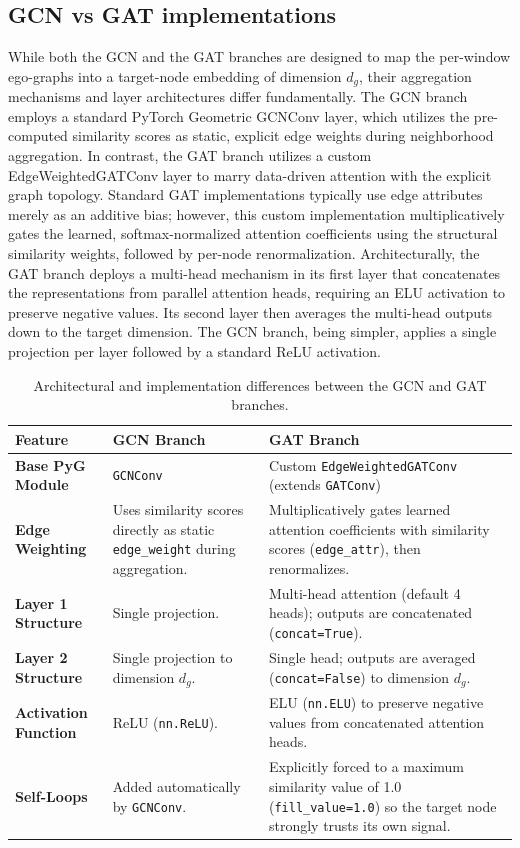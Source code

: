 \subsection{GCN vs GAT implementations}
While both the GCN and the GAT branches are designed to map the per-window ego-graphs into a target-node embedding of dimension $d_g$, their aggregation mechanisms and layer architectures differ fundamentally. The GCN branch employs a standard PyTorch Geometric GCNConv layer, which utilizes the pre-computed similarity scores as static, explicit edge weights during neighborhood aggregation. In contrast, the GAT branch utilizes a custom EdgeWeightedGATConv layer to marry data-driven attention with the explicit graph topology. Standard GAT implementations typically use edge attributes merely as an additive bias; however, this custom implementation multiplicatively gates the learned, softmax-normalized attention coefficients using the structural similarity weights, followed by per-node renormalization. Architecturally, the GAT branch deploys a multi-head mechanism in its first layer that concatenates the representations from parallel attention heads, requiring an ELU activation to preserve negative values. Its second layer then averages the multi-head outputs down to the target dimension. The GCN branch, being simpler, applies a single projection per layer followed by a standard ReLU activation. 

\begin{table}[htpb]
\centering
\caption{Architectural and implementation differences between the GCN and GAT branches.}
\label{tab:gcn_vs_gat}
\begin{tabular}{@{} l p{5cm} p{6.5cm} @{}}
\toprule
\textbf{Feature} & \textbf{GCN Branch} & \textbf{GAT Branch} \\
\midrule
\textbf{Base PyG Module} & \texttt{GCNConv} & Custom \texttt{EdgeWeightedGATConv} (extends \texttt{GATConv}) \\
\addlinespace
\textbf{Edge Weighting} & Uses similarity scores directly as static \texttt{edge\_weight} during aggregation. & Multiplicatively gates learned attention coefficients with similarity scores (\texttt{edge\_attr}), then renormalizes. \\
\addlinespace
\textbf{Layer 1 Structure} & Single projection. & Multi-head attention (default 4 heads); outputs are concatenated (\texttt{concat=True}). \\
\addlinespace
\textbf{Layer 2 Structure} & Single projection to dimension $d_g$. & Single head; outputs are averaged (\texttt{concat=False}) to dimension $d_g$. \\
\addlinespace
\textbf{Activation Function} & ReLU (\texttt{nn.ReLU}). & ELU (\texttt{nn.ELU}) to preserve negative values from concatenated attention heads. \\
\addlinespace
\textbf{Self-Loops} & Added automatically by \texttt{GCNConv}. & Explicitly forced to a maximum similarity value of 1.0 (\texttt{fill\_value=1.0}) so the target node strongly trusts its own signal. \\
\bottomrule
\end{tabular}
\end{table}